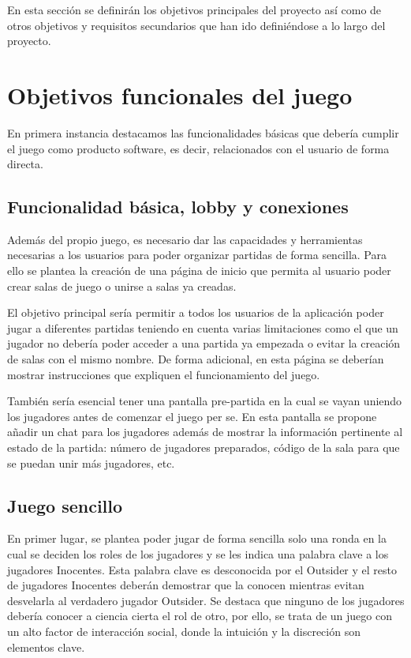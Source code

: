 En esta sección se definirán los objetivos principales del proyecto así como de otros objetivos y
requisitos secundarios que han ido definiéndose a lo largo del proyecto.

\section{Objetivos funcionales del juego} \label{Objetivos}

En primera instancia destacamos las funcionalidades básicas que debería cumplir el juego como
producto software, es decir, relacionados con el usuario de forma directa.

\subsection{Funcionalidad básica, lobby y conexiones}

Además del propio juego, es necesario dar las capacidades y herramientas necesarias a los usuarios para
poder organizar partidas de forma sencilla. Para ello se plantea la creación de una página de inicio que
permita al usuario poder crear salas de juego o unirse a salas ya creadas.

El objetivo principal sería permitir a todos los usuarios de la aplicación poder jugar a
diferentes partidas teniendo en cuenta varias limitaciones como el que un jugador no debería poder acceder
a una partida ya empezada o evitar la creación de salas con el mismo nombre. De forma adicional, en esta página se deberían mostrar instrucciones que expliquen el funcionamiento
del juego.

También sería esencial tener una pantalla pre-partida en la cual se vayan uniendo los jugadores
antes de comenzar el juego per se. En esta pantalla se propone añadir un chat para los jugadores además
de mostrar la información pertinente al estado de la partida: número de jugadores preparados, código de la
sala para que se puedan unir más jugadores, etc.

\subsection{Juego sencillo}

En primer lugar, se plantea poder jugar de forma sencilla solo una ronda en la cual se deciden los
roles de los jugadores y se les indica una palabra clave a los jugadores Inocentes. Esta palabra 
clave es desconocida por el Outsider y el resto de jugadores Inocentes deberán demostrar 
que la conocen mientras evitan desvelarla al verdadero jugador Outsider. Se destaca 
que ninguno de los jugadores debería conocer a ciencia cierta el rol de otro, por ello, se trata de un juego 
con un alto factor de interacción social, donde la intuición y la discreción son elementos clave.

